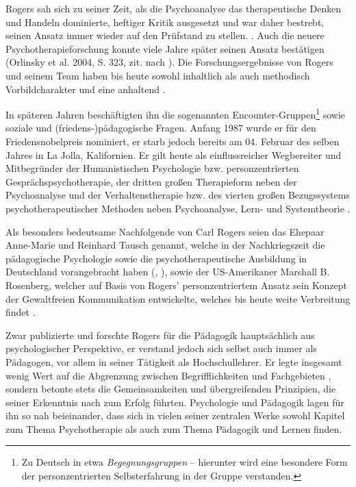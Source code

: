 \documentclass[
  twoside,
  parskip=half-,
]{scrreprt}
\begin{document}
Rogers sah sich zu seiner Zeit, als die Psychoanalyse das therapeutische Denken und Handeln dominierte, heftiger Kritik ausgesetzt und war daher bestrebt, seinen Ansatz immer wieder auf den Prüfstand zu stellen. . Auch die neuere Psychotherapieforschung konnte viele Jahre später seinen Ansatz bestätigen (Orlinsky et al. 2004, S. 323, zit. nach \cite[21]{weinberger}). Die Forschungsergebnisse von Rogers und seinem Team haben bis heute sowohl inhaltlich als auch methodisch Vorbildcharakter und eine anhaltend  \autocite[239]{kunze}.

In späteren Jahren beschäftigten ihn die sogenannten Encounter-Gruppen\footnote{Zu Deutsch in etwa \textit{Begegnungsgruppen} -- hierunter wird eine besondere Form der personzentrierten Selbsterfahrung in der Gruppe verstanden.} sowie soziale und (friedens-)pädagogische Fragen. Anfang 1987 wurde er für den Friedensnobelpreis nominiert, er starb jedoch bereits am 04. Februar des selben Jahres in La Jolla, Kalifornien. Er gilt heute als einflussreicher Wegbereiter und Mitbegründer der Humanistischen Psychologie bzw. personzentrierten Gesprächspsychotherapie, der dritten großen Therapieform neben der Psychoanalyse und der Verhaltenstherapie \autocite[vgl.][24]{weinberger} bzw. des vierten großen Bezugssystems psychotherapeutischer Methoden neben Psychoanalyse, Lern- und Systemtheorie \autocite[892]{integrativePsycho}.

Als besonders bedeutsame Nachfolgende von Carl Rogers seien das Ehepaar Anne-Marie und Reinhard Tausch genannt, welche in der Nachkriegszeit die pädagogische Psychologie sowie die psychotherapeutische Ausbildung in Deutschland vorangebracht haben (\cite[vgl.][31]{weinberger}, \cite[vgl.][58]{kunze}), sowie der US-Amerikaner Marshall B. Rosenberg, welcher auf Basis von Rogers' personzentriertem Ansatz sein Konzept der Gewaltfreien Kommunikation entwickelte, welches bis heute weite Verbreitung findet \autocite[vgl.][58]{kunze}.

Zwar publizierte und forschte Rogers für die Pädagogik hauptsächlich aus psychologischer Perspektive, er verstand jedoch sich selbst auch immer als Pädagogen, vor allem in seiner Tätigkeit als Hochschullehrer. Er legte insgesamt wenig Wert auf die Abgrenzung zwischen Begrifflichkeiten und Fachgebieten \autocite[vgl.][17]{rogers1942}, sondern betonte stets die Gemeinsamkeiten und übergreifenden Prinzipien, die seiner Erkenntnis nach zum Erfolg führten. Psychologie und Pädagogik lagen für ihn so nah beieinander, dass sich in vielen seiner zentralen Werke sowohl Kapitel zum Thema Psychotherapie als auch zum Thema Pädagogik und Lernen finden. 
\end{document}

